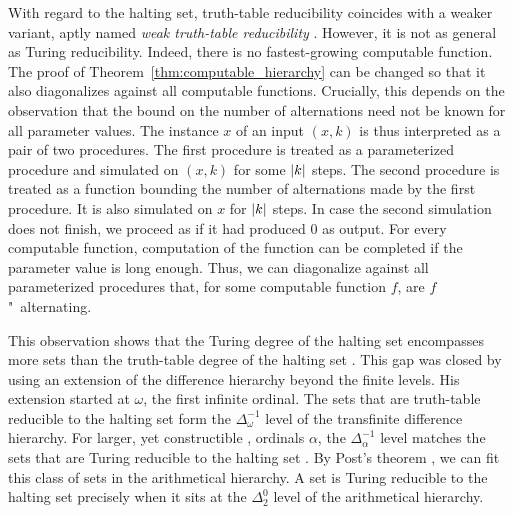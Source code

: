 With regard to the halting set, truth-table reducibility coincides with a weaker variant, aptly named \emph{weak truth-table reducibility} \parencite{odifreddi1992classical,downey2010algorithmic}.
However, it is not as general as Turing reducibility.
Indeed, there is no fastest-growing computable function.
The proof of Theorem~\ref{thm:computable_hierarchy} can be changed so that it also diagonalizes against all computable functions.
Crucially, this depends on the observation that the bound on the number of alternations need not be known for all parameter values.
The instance $x$ of an input $(x, k)$ is thus interpreted as a pair of two procedures.
The first procedure is treated as a parameterized procedure and simulated on $(x, k)$ for some ${\lvert k\rvert}$ steps.
The second procedure is treated as a function bounding the number of alternations made by the first procedure.
It is also simulated on $x$ for ${\lvert k\rvert}$ steps.
In case the second simulation does not finish, we proceed as if it had produced $0$ as output.
For every computable function, computation of the function can be completed if the parameter value is long enough.
Thus, we can diagonalize against all parameterized procedures that, for some computable function $f$, are $f$"~alternating.

This observation shows that the Turing degree of the halting set encompasses more sets than the truth-table degree of the halting set \parencite{epstein1981hierarchies,arslanov1997degree,downey2010algorithmic}.
This gap was closed by \textcite{ershov1968hierarchyii} using an extension of the difference hierarchy beyond the finite levels.
His extension started at $\omega$, the first infinite ordinal.
The sets that are truth-table reducible to the halting set form the $\Delta^{-1}_\omega$ level of the transfinite difference hierarchy.
For larger, yet constructible \parencite{rogers1967theory}, ordinals $\alpha$, the $\Delta^{-1}_\alpha$ level matches the sets that are Turing reducible to the halting set \parencite{ershov1968hierarchyii,epstein1981hierarchies}.
By Post's theorem \parencite{post1948degrees,rogers1967theory}, we can fit this class of sets in the arithmetical hierarchy.
A set is Turing reducible to the halting set precisely when it sits at the $\Delta^0_2$ level of the arithmetical hierarchy.

